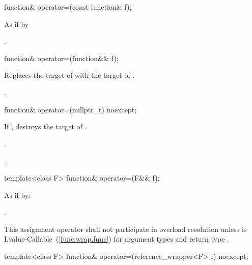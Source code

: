 %
\begin{itemdecl}
function& operator=(const function& f);
\end{itemdecl}

\begin{itemdescr}
\pnum
\effects As if by 

\pnum
\returns {}.
\end{itemdescr}

%
\begin{itemdecl}
function& operator=(function&& f);
\end{itemdecl}

\begin{itemdescr}
\pnum
\effects Replaces the target of 
with the target of .

\pnum
\returns {}.
\end{itemdescr}

%
\begin{itemdecl}
function& operator=(nullptr_t) noexcept;
\end{itemdecl}

\begin{itemdescr}
\pnum\effects If , destroys the target of .

\pnum\postconditions {}.

\pnum\returns {}.
\end{itemdescr}

%
\begin{itemdecl}
template<class F> function& operator=(F&& f);
\end{itemdecl}

\begin{itemdescr}
\pnum\effects As if by: 

\pnum\returns {}.

\pnum\remarks This assignment operator shall not participate in overload
resolution unless  is
Lvalue-Callable~(\ref{func.wrap.func}) for argument types  and
return type .
\end{itemdescr}

%
\begin{itemdecl}
template<class F> function& operator=(reference_wrapper<F> f) noexcept;
\end{itemdecl}

